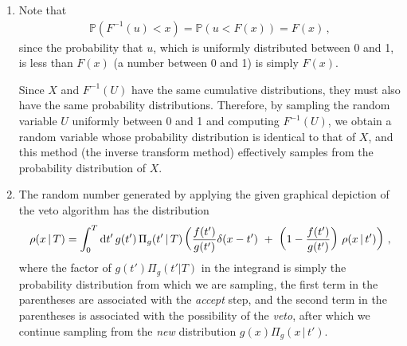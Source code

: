 \begin{enumerate}[label=\alph*)]
    \item
        Note that
        \begin{align}
            \mathbb{P}(F^{-1}(u) < x)
            =
            \mathbb{P}(u < F(x))
            =
            F(x)
            \,,
        \end{align}
        since the probability that \(u\), which is uniformly distributed between 0 and 1, is less than \(F(x)\) (a number between 0 and 1) is simply \(F(x)\).

        Since \(X\) and \(F^{-1}(U)\) have the same cumulative distributions, they must also have the same probability distributions.
        Therefore, by sampling the random variable \(U\) uniformly between 0 and 1 and computing \(F^{-1}(U)\), we obtain a random variable whose probability distribution is identical to that of \(X\), and this method (the inverse transform method) effectively samples from the probability distribution of \(X\).


        \item
            The random number generated by applying the given graphical depiction of the veto algorithm has the distribution
            \begin{align}
                \rho(x \, | \, T)
                =
                \int_0^T \dd t'
                \,
                g(t') \, \Pi_g (t' \, | \, T)
                \left(
                    \frac{f(t')}{g(t')}
                    \delta(x - t')
                    \,\,
                    +
                    \,\,
                    \left(1 - \frac{f(t')}{g(t')}\right)
                    \,
                    \rho(x \, | \, t')
                \right)
                \,,
            \end{align}
            where the factor of \(g(t') \Pi_g(t'|T)\) in the integrand is simply the probability distribution from which we are sampling, the first term in the parentheses are associated with the \textit{accept} step, and the second term in the parentheses is associated with the possibility of the \textit{veto}, after which we continue sampling from the \textit{new} distribution \(g(x) \Pi_g(x \, | \, t')\).


\end{enumerate}
